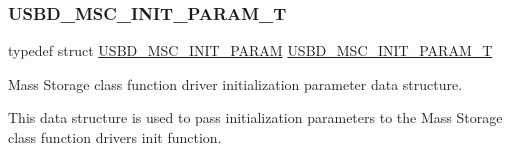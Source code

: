 \subsubsection{\texorpdfstring{U\+S\+B\+D\+\_\+\+M\+S\+C\+\_\+\+I\+N\+I\+T\+\_\+\+P\+A\+R\+A\+M\+\_\+T}{USBD\_MSC\_INIT\_PARAM\_T}}
{\footnotesize\ttfamily typedef struct \hyperlink{struct_u_s_b_d___m_s_c___i_n_i_t___p_a_r_a_m}{U\+S\+B\+D\+\_\+\+M\+S\+C\+\_\+\+I\+N\+I\+T\+\_\+\+P\+A\+R\+AM}  \hyperlink{group___u_s_b_d___m_s_c_ga01cbe726c0ee97ee44661ca88d7e8fbd}{U\+S\+B\+D\+\_\+\+M\+S\+C\+\_\+\+I\+N\+I\+T\+\_\+\+P\+A\+R\+A\+M\+\_\+T}}



Mass Storage class function driver initialization parameter data structure. 

This data structure is used to pass initialization parameters to the Mass Storage class function driver\textquotesingle{}s init function. 